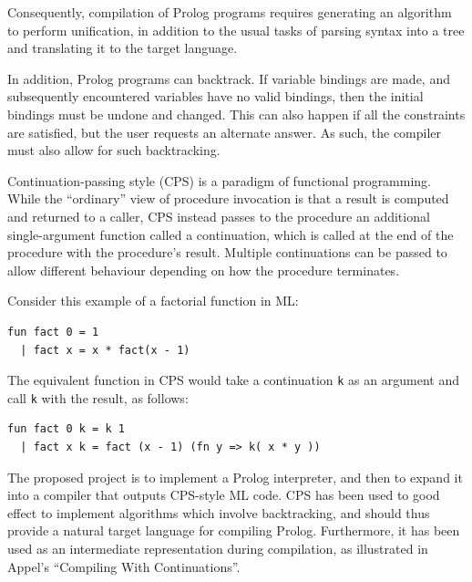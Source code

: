 \documentclass[12pt]{article}
\begin{document}

Consequently, compilation of Prolog programs requires generating an algorithm to perform unification, in addition to the usual tasks of parsing syntax into a tree and translating it to the target language.

In addition, Prolog programs can backtrack. If variable bindings are made, and subsequently encountered variables have no valid bindings, then the initial bindings must be undone and changed. This can also happen if all the constraints are satisfied, but the user requests an alternate answer. As such, the compiler must also allow for such backtracking.

Continuation-passing style (CPS) is a paradigm of functional programming. While the ``ordinary'' view of procedure invocation is that a result is computed and returned to a caller, CPS instead passes to the procedure an additional single-argument function called a continuation, which is called at the end of the procedure with the procedure's result. Multiple continuations can be passed to allow different behaviour depending on how the procedure terminates.

Consider this example of a factorial function in ML:
\begin{verbatim}
fun fact 0 = 1
  | fact x = x * fact(x - 1)
\end{verbatim}

The equivalent function in CPS would take a continuation \verb|k| as an argument and call \verb|k| with the result, as follows:
\begin{verbatim}
fun fact 0 k = k 1
  | fact x k = fact (x - 1) (fn y => k( x * y ))
\end{verbatim}

The proposed project is to implement a Prolog interpreter, and then to expand it into a compiler that outputs CPS-style ML code. CPS has been used to good effect to implement algorithms which involve backtracking, and should thus provide a natural target language for compiling Prolog. Furthermore, it has been used as an intermediate representation during compilation, as illustrated in Appel's ``Compiling With Continuations''.
\end{document}
